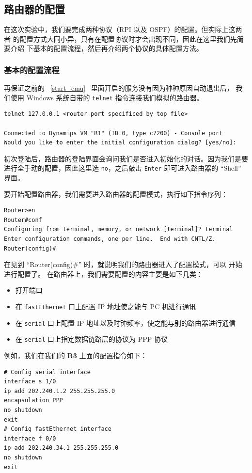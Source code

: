\documentclass[black,normal,cn]{elegantnote}
\begin{document}
\subsection{路由器的配置}

在这次实验中，我们要完成两种协议（RPI 以及 OSPF）的配置。但实际上这两者
的配置方式大同小异，只有在配置协议时才会出现不同，因此在这里我们先简要介绍
下基本的配置流程，然后再介绍两个协议的具体配置方法。

\subsubsection{基本的配置流程}
再保证之前的 ~\ref{start_emu}~ 里面开启的服务没有因为种种原因自动退出后，
我们使用 Windows 系统自带的 \texttt{telnet} 指令连接我们模拟的路由器。

\begin{lstlisting}
telnet 127.0.0.1 <router port specificed by top file>

Connected to Dynamips VM "R1" (ID 0, type c7200) - Console port
Would you like to enter the initial configuration dialog? [yes/no]:
\end{lstlisting}

初次登陆后，路由器的登陆界面会询问我们是否进入初始化的对话。因为我们是要
进行全手动的配置，因此这里选 \texttt{no}，之后敲击 \texttt{Enter}
即可进入路由器的 ``Shell'' 界面。

要开始配置路由器，我们需要进入路由器的配置模式，执行如下指令序列：

\begin{lstlisting}
Router>en
Router#conf
Configuring from terminal, memory, or network [terminal]? terminal
Enter configuration commands, one per line.  End with CNTL/Z.
Router(config)#
\end{lstlisting}

在见到 ``Router(config)\#'' 时，就说明我们的路由器进入了配置模式，可以
开始进行配置了。
在路由器上，我们需要配置的内容主要是如下几类：
\begin{itemize}
    \item 打开端口
    \item 在 \texttt{fastEthernet} 口上配置 IP 地址使之能与 PC 机进行通讯
    \item 在 \texttt{serial} 口上配置 IP 地址以及时钟频率，使之能与别的路由器进行通信
    \item 在 \texttt{serial} 口上指定数据链路层的协议为 PPP 协议
\end{itemize}
例如，我们在我们的 \textbf{R3} 上面的配置指令如下：
\begin{lstlisting}
# Config serial interface
interface s 1/0
ip add 202.240.1.2 255.255.255.0
encapsulation PPP
no shutdown
exit
# Config fastEthernet interface
interface f 0/0
ip add 202.240.34.1 255.255.255.0
no shutdown
exit
\end{lstlisting}
\end{document}
